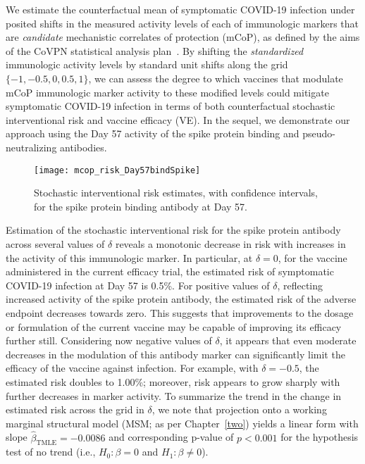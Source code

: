 We estimate the counterfactual mean of symptomatic COVID-19 infection under
posited shifts in the measured activity levels of each of immunologic markers
that are \emph{candidate} mechanistic correlates of protection (mCoP), as
defined by the aims of the CoVPN statistical analysis
plan~\citep{gilbert2021covpn}. By shifting the \emph{standardized} immunologic
activity levels by standard unit shifts along the grid $\{-1, -0.5, 0, 0.5,
1\}$, we can assess the degree to which vaccines that modulate mCoP immunologic
marker activity to these modified levels could mitigate symptomatic COVID-19
infection in terms of both counterfactual stochastic interventional risk and
vaccine efficacy (VE). In the sequel, we demonstrate our approach using the Day
57 activity of the spike protein binding and pseudo-neutralizing antibodies.

\begin{figure}[H]
  \centering
  \texttt{[image: mcop\_risk\_Day57bindSpike]}
  \caption{Stochastic interventional risk estimates, with confidence intervals,
  for the spike protein binding antibody at Day 57.}
  \label{fig:marker1-risk-day57}
\end{figure}

Estimation of the stochastic interventional risk for the spike protein antibody
across several values of $\delta$ reveals a monotonic decrease in risk with
increases in the activity of this immunologic marker. In particular, at $\delta
= 0$, for the vaccine administered in the current efficacy trial, the estimated
risk of symptomatic COVID-19 infection at Day 57 is 0.5\%. For positive values
of $\delta$, reflecting increased activity of the spike protein antibody, the
estimated risk of the adverse endpoint decreases towards zero. This suggests
that improvements to the dosage or formulation of the current vaccine may be
capable of improving its efficacy further still. Considering now negative values
of $\delta$, it appears that even moderate decreases in the modulation of this
antibody marker can significantly limit the efficacy of the vaccine against
infection. For example, with $\delta = -0.5$, the estimated risk doubles to
1.00\%; moreover, risk appears to grow sharply with further decreases in marker
activity. To summarize the trend in the change in estimated risk across the grid
in $\delta$, we note that projection onto a working marginal structural model
(MSM; as per Chapter~\ref{two}) yields a linear form with slope
$\hat{\beta}_{\text{TMLE}} = -0.0086$ and corresponding p-value of $p < 0.001$
for the hypothesis test of no trend (i.e., $H_0: \beta = 0$ and $H_1: \beta
\neq 0$).

